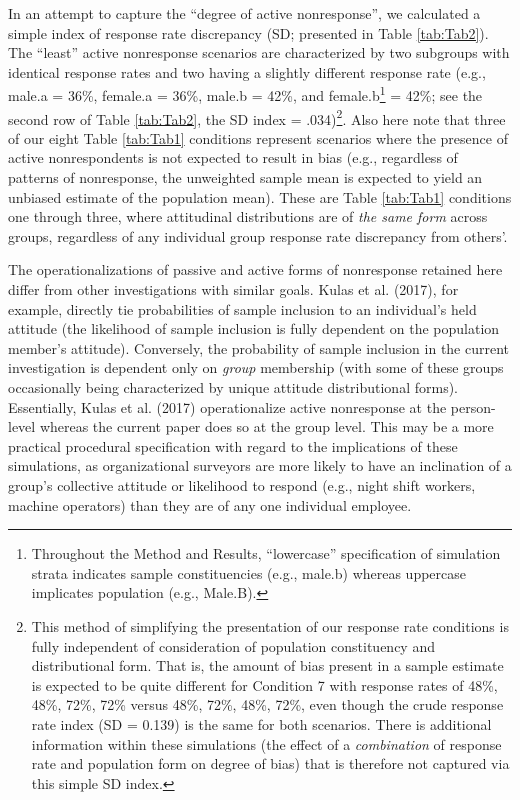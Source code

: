 \documentclass[
  man,mask]{apa7}
\begin{document}
In an attempt to capture the ``degree of active nonresponse'', we calculated a simple index of response rate discrepancy (SD; presented in Table \ref{tab:Tab2}). The ``least'' active nonresponse scenarios are characterized by two subgroups with identical response rates and two having a slightly different response rate (e.g., male.a = 36\%, female.a = 36\%, male.b = 42\%, and female.b\footnote{Throughout the Method and Results, ``lowercase'' specification of simulation strata indicates sample constituencies (e.g., male.b) whereas uppercase implicates population (e.g., Male.B).} = 42\%; see the second row of Table \ref{tab:Tab2}, the SD index = .034)\footnote{This method of simplifying the presentation of our response rate conditions is fully independent of consideration of population constituency and distributional form. That is, the amount of bias present in a sample estimate is expected to be quite different for Condition 7 with response rates of 48\%, 48\%, 72\%, 72\% versus 48\%, 72\%, 48\%, 72\%, even though the crude response rate index (SD = 0.139) is the same for both scenarios. There is additional information within these simulations (the effect of a \emph{combination} of response rate and population form on degree of bias) that is therefore not captured via this simple SD index.}. Also here note that three of our eight Table \ref{tab:Tab1} conditions represent scenarios where the presence of active nonrespondents is not expected to result in bias (e.g., regardless of patterns of nonresponse, the unweighted sample mean is expected to yield an unbiased estimate of the population mean). These are Table \ref{tab:Tab1} conditions one through three, where attitudinal distributions are of \emph{the same form} across groups, regardless of any individual group response rate discrepancy from others'.

The operationalizations of passive and active forms of nonresponse retained here differ from other investigations with similar goals. Kulas et al. (2017), for example, directly tie probabilities of sample inclusion to an individual's held attitude (the likelihood of sample inclusion is fully dependent on the population member's attitude). Conversely, the probability of sample inclusion in the current investigation is dependent only on \emph{group} membership (with some of these groups occasionally being characterized by unique attitude distributional forms). Essentially, Kulas et al. (2017) operationalize active nonresponse at the person-level whereas the current paper does so at the group level. This may be a more practical procedural specification with regard to the implications of these simulations, as organizational surveyors are more likely to have an inclination of a group's collective attitude or likelihood to respond (e.g., night shift workers, machine operators) than they are of any one individual employee.
\end{document}
